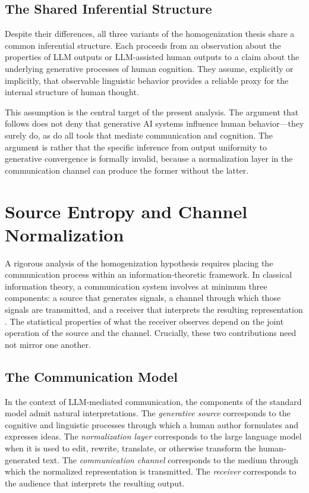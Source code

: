 \documentclass[12pt,a4paper]{article}
\theoremstyle{definition}
\theoremstyle{plain}
\theoremstyle{remark}
\begin{document}
\subsection{The Shared Inferential Structure}

Despite their differences, all three variants of the homogenization thesis share a common
inferential structure. Each proceeds from an observation about the properties of LLM outputs
or LLM-assisted human outputs to a claim about the underlying generative processes of human
cognition. They assume, explicitly or implicitly, that observable linguistic behavior provides
a reliable proxy for the internal structure of human thought.

This assumption is the central target of the present analysis. The argument that follows does
not deny that generative AI systems influence human behavior---they surely do, as do all
tools that mediate communication and cognition. The argument is rather that the specific
inference from output uniformity to generative convergence is formally invalid, because a
normalization layer in the communication channel can produce the former without the latter.

\section{Source Entropy and Channel Normalization}
\label{sec:sourceentropy}

A rigorous analysis of the homogenization hypothesis requires placing the communication
process within an information-theoretic framework. In classical information theory, a
communication system involves at minimum three components: a source that generates signals,
a channel through which those signals are transmitted, and a receiver that interprets the
resulting representation \citep{shannon1948}. The statistical properties of what the receiver
observes depend on the joint operation of the source and the channel. Crucially, these two
contributions need not mirror one another.

\subsection{The Communication Model}

In the context of LLM-mediated communication, the components of the standard model admit
natural interpretations. The \emph{generative source} corresponds to the cognitive and
linguistic processes through which a human author formulates and expresses ideas. The
\emph{normalization layer} corresponds to the large language model when it is used to edit,
rewrite, translate, or otherwise transform the human-generated text. The
\emph{communication channel} corresponds to the medium through which the normalized
representation is transmitted. The \emph{receiver} corresponds to the audience that
interprets the resulting output.
\end{document}
